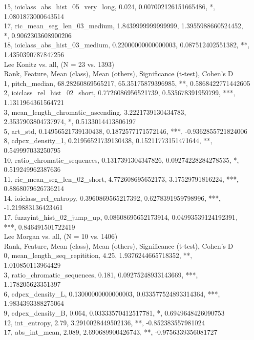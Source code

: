15, ioiclass_abs_hist_05_very_long, 0.024, 0.007002126151665486, *, 1.0801873000643514\\
17, ric_mean_seg_len_03_medium, 1.8439999999999999, 1.3955988660524452, *, 0.9062303608900206\\
18, ioiclass_abs_hist_03_medium, 0.22000000000000003, 0.087512402551382, **, 1.4350390787847256\\
Lee Konitz vs. all, (N = 23 vs. 1393)\\
Rank, Feature, Mean (class), Mean (others), Significance (t-test), Cohen's D\\
1, pitch_median, 68.28260869565217, 65.35175879396985, **, 0.5868422771442605\\
2, ioiclass_rel_hist_02_short, 0.7726086956521739, 0.535678391959799, ***, 1.1311964361564721\\
3, mean_length_chromatic_ascending, 3.2221739130434783, 2.3537903804737974, *, 0.5133014413806197\\
5, art_std, 0.14956521739130438, 0.1872577171572146, ***, -0.9362855721824006\\
8, cdpcx_density_1, 0.21956521739130438, 0.15211773151471644, **, 0.549997033250795\\
10, ratio_chromatic_sequences, 0.1317391304347826, 0.09274228284278535, *, 0.519249962387636\\
11, ric_mean_seg_len_02_short, 4.772608695652173, 3.17529791816224, ***, 0.8868079626736214\\
14, ioiclass_rel_entropy, 0.3960869565217392, 0.6278391959798996, ***, -1.219883136423461\\
17, fuzzyint_hist_02_jump_up, 0.08608695652173914, 0.04993539124192391, ***, 0.846491501722419\\
Lee Morgan vs. all, (N = 10 vs. 1406)\\
Rank, Feature, Mean (class), Mean (others), Significance (t-test), Cohen's D\\
0, mean_length_seq_repitition, 4.25, 1.9376244665718352, **, 1.010850113964429\\
3, ratio_chromatic_sequences, 0.181, 0.09275248933143669, ***, 1.178205623351397\\
6, cdpcx_density_L, 0.13000000000000003, 0.033577524893314364, ***, 1.9834393388275064\\
9, cdpcx_density_B, 0.064, 0.03333570412517781, *, 0.6949648426090753\\
12, int_entropy, 2.79, 3.2910028449502136, **, -0.852383557981024\\
17, abs_int_mean, 2.089, 2.690689900426743, **, -0.9756339356081727\\
